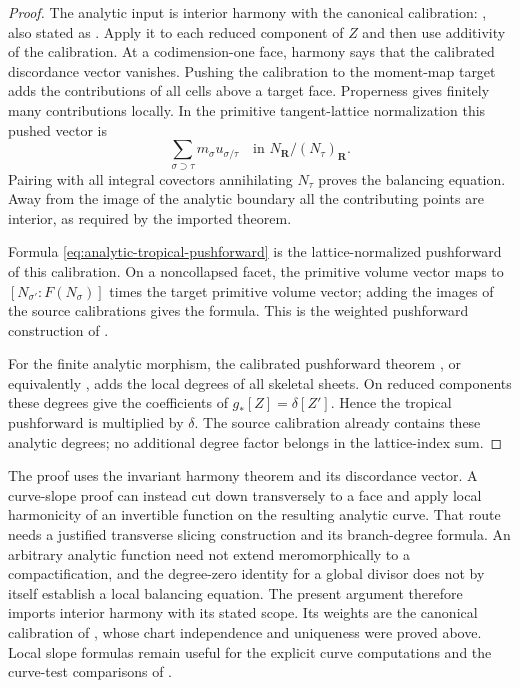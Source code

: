 \begin{proof}
The analytic input is interior harmony with the canonical calibration:
\cite[Theorem~15.6.1]{CLD25}, also stated as
. Apply it to each reduced component of
$Z$ and then use additivity of the calibration. At a codimension-one face,
harmony says that the calibrated discordance vector vanishes. Pushing the
calibration to the moment-map target adds the contributions of all cells
above a target face. Properness gives finitely many contributions locally.
In the primitive tangent-lattice normalization this pushed vector is
\[
                  \sum_{\sigma\supset\tau}
                    m_\sigma u_{\sigma/\tau}
                  \quad\text{in }N_{\mathbf R}/(N_\tau)_{\mathbf R}.
\]
Pairing with all integral covectors annihilating $N_\tau$ proves the
balancing equation. Away from the image of the analytic boundary all the
contributing points are interior, as required by the imported theorem.

Formula \eqref{eq:analytic-tropical-pushforward} is the lattice-normalized
pushforward of this calibration. On a noncollapsed facet, the primitive
volume vector maps to $[N_{\sigma'}:F(N_\sigma)]$ times the target primitive
volume vector; adding the images of the source calibrations gives the
formula. This is the weighted pushforward construction of
.

For the finite analytic morphism, the calibrated pushforward theorem
, or equivalently
\cite[Proposition~14.4.2]{CLD25}, adds the local degrees of all skeletal
sheets. On reduced components these degrees give the coefficients of
$g_*[Z]=\delta[Z']$. Hence the tropical pushforward is multiplied by
$\delta$. The source calibration already contains these analytic degrees;
no additional degree factor belongs in the lattice-index sum.
\end{proof}

\begin{remark}
\label{rem:trop-balancing-two-routes}
The proof uses the invariant harmony theorem and its discordance vector.
A curve-slope proof can instead cut down transversely to a face and apply
local harmonicity of an invertible function on the resulting analytic
curve. That route needs a justified transverse slicing construction and
its branch-degree formula. An arbitrary analytic function need not extend
meromorphically to a compactification, and the degree-zero identity for a
global divisor does not by itself establish a local balancing equation.
The present argument therefore imports interior harmony with its stated
scope. Its weights are the canonical calibration of
, whose chart independence and
uniqueness were proved above. Local slope formulas remain useful for the
explicit curve computations and the curve-test comparisons of
.
\end{remark}

